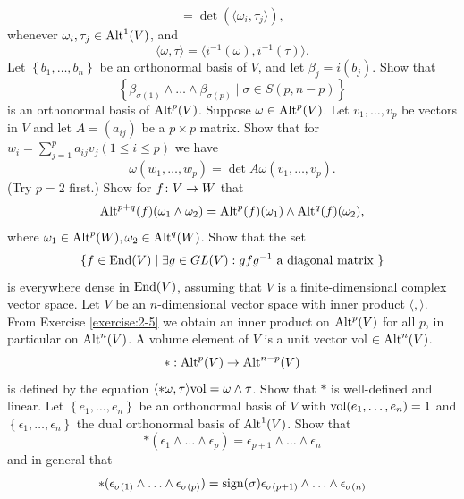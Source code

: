 \begin{enumerate}[label=\theexercise.\arabic*.,ref=\theexercise.\arabic*,leftmargin=2.7em]
\[      = \det ( \langle  {{\omega }_{i},{\tau }_{j}}\rangle  ),
    \]
    whenever ${\omega }_{i},{\tau }_{j} \in  {\operatorname{Alt}}^{1}( V)$, and
    \[
      \langle \omega,\tau \rangle  = \langle  {{i}^{-1}( \omega ),{i}^{-1}( \tau ) }\rangle .
    \]
    Let $\left\{  {b_1,\ldots,{b}_{n}}\right\}$ be an orthonormal basis of $V$, and let ${\beta }_{j} = i( {b}_{j})$.
    Show that
    \[
      \left\{  {{\beta }_{\sigma ( 1) } \land  \ldots  \land  {\beta }_{\sigma ( p) } \mid  \sigma  \in  S( {p,n- p}) }\right\}
    \]
    is an orthonormal basis of ${\operatorname{Alt}}^{p}( V)$.
  \NewItem Suppose $\omega  \in  {\operatorname{Alt}}^{p}( V)$. Let ${v}_{1},\ldots,{v}_{p}$ be vectors in $V$ and let $A = ( {a}_{ij})$ be
    a $p \times  p$ matrix. Show that for ${w}_{i} = \sum_{{j = 1}}^{p}{a}_{ij}{v}_{j}( {1 \leq  i \leq  p})$
    we have
    \[
      \omega ( {{w}_{1},\ldots,{w}_{p}})  = \det {A\omega }( {{v}_{1},\ldots,{v}_{p}}).
    \]
    (Try $p = 2$ first.)
  \NewItem Show for $f\colon V \rightarrow  W$ that
    \[
      {\operatorname{Alt}}^{p + q}( f) ( {{\omega }_{1} \land  {\omega }_{2}})  = {\operatorname{Alt}}^{p}( f) ( {\omega }_{1})  \land  {\operatorname{Alt}}^{q}( f) ( {\omega }_{2}),
    \]
    where ${\omega }_{1} \in  {\operatorname{Alt}}^{p}( W),{\omega }_{2} \in  {\operatorname{Alt}}^{q}( W)$.
  \NewItem Show that the set
    \[
      \{ f \in  \mathrm{End}( V)  \mid  \exists g \in  {GL}( V): {gf}{g}^{-1}\text{ a diagonal matrix }\}
    \]
    is everywhere dense in $\mathrm{End}( V)$, assuming that $V$ is a finite-dimensional complex vector space.
  \NewItem Let $V$ be an $n$-dimensional vector space with inner product $\langle,\rangle$. From
    Exercise \ref{exercise:2-5} we obtain an inner product on ${\operatorname{Alt}}^{p}( V)$ for all $p$, in particular on ${\operatorname{Alt}}^{n}( V)$.
    A volume element of $V$ is a unit vector vol $\in  {\operatorname{Alt}}^{n}( V)$. 
    \[
      *:{\operatorname{Alt}}^{p}( V)  \rightarrow  {\operatorname{Alt}}^{n- p}( V)
    \]
    is defined by the equation $\langle * \omega,\tau \rangle \mathrm{vol} = \omega  \land  \tau$. Show that $*$ is
    well-defined and linear.
    Let $\left\{  {{e}_{1},\ldots,{e}_{n}}\right\}$ be an orthonormal basis of $V$ with $\mathrm{vol}( {{e}_{1},\ldots,{e}_{n}}) = 1$
    and $\left\{  {{\epsilon }_{1},\ldots,{\epsilon }_{n}}\right\}$ the dual orthonormal basis of ${\operatorname{Alt}}^{1}( V)$.
    Show that
    \[
      * ( {{\epsilon }_{1} \land  \ldots  \land  {\epsilon }_{p}})
      = {\epsilon }_{p + 1} \land  \ldots  \land  {\epsilon }_{n}
    \]
    and in general that
    \[
      * ( {{\epsilon }_{\sigma ( 1) } \land  \ldots  \land  {\epsilon }_{\sigma ( p) }})
      = \mathrm{sign}( \sigma ) {\epsilon }_{\sigma ( {p + 1}) } \land  \ldots  \land  {\epsilon }_{\sigma ( n) }
\]
\end{enumerate}
